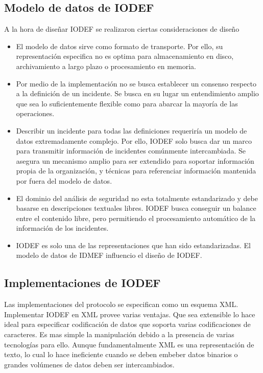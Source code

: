 \subsection{Modelo de datos de IODEF}
A la hora de diseñar IODEF se realizaron ciertas consideraciones de diseño
\begin{itemize}
  \item El modelo de datos sirve como formato de transporte. Por ello, su 
  representación especifica no es optima para almacenamiento en disco, 
  archivamiento a largo plazo o procesamiento en memoria.
  \item Por medio de la implementación no se busca establecer un consenso 
  respecto a la definición de un incidente. Se busca en su lugar un 
  entendimiento amplio que sea lo suficientemente flexible como para abarcar la 
  mayoría de las operaciones.
  \item Describir un incidente para todas las definiciones requeriría un modelo 
  de datos extremadamente complejo. Por ello, IODEF solo busca dar un marco para 
  transmitir información de incidentes comúnmente intercambiada. Se asegura un 
  mecanismo amplio para ser extendido para soportar información propia de la 
  organización, y técnicas para referenciar información mantenida por fuera del 
  modelo de datos.
  \item El dominio del análisis de seguridad no esta totalmente estandarizado y 
  debe basarse en descripciones textuales libres. IODEF busca conseguir un 
  balance entre el contenido libre, pero permitiendo el procesamiento automático 
  de la información de los incidentes.
  \item IODEF es solo una de las representaciones que han sido estandarizadas. 
  El modelo de datos de IDMEF influencio el diseño de IODEF.
\end{itemize}

\subsection{Implementaciones de IODEF}
Las implementaciones del protocolo se especifican como un esquema XML. 
Implementar IODEF en XML provee varias ventajas. Que sea extensible lo hace 
ideal para especificar codificación de datos que soporta varias codificaciones 
de caracteres. Es mas simple la manipulación debido a la presencia de varias 
tecnologías para ello. Aunque fundamentalmente XML es una representación de 
texto, lo cual lo hace ineficiente cuando se deben embeber datos binarios o 
grandes volúmenes de datos deben ser intercambiados.

